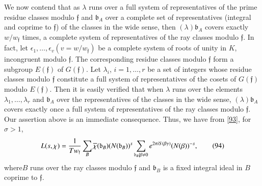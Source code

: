 We now contend that as $\lambda$ runs over a full system of
representatives of the prime residue classes modulo $\mathfrak{f}$ and
$\mathfrak{b}_{A}$ over a complete set of representatives (integral
and coprime to $\mathfrak{f}$) of the classes in the wide sense, then
$(\lambda)\mathfrak{b}_{A}$ covers exactly $w/w_{\mathfrak{f}}$ times,
a complete system of representatives of the ray classes modulo
$\mathfrak{f}$. In fact, let
$\epsilon_{1},\ldots,\epsilon_{v}(v=w/w_{\mathfrak{f}})$ be a complete
system of roots of unity in $K$, incongruent modulo
$\mathfrak{f}$. The corresponding residue classes modulo
$\mathfrak{f}$ form a subgroup $E(\mathfrak{f})$ of
$G(\mathfrak{f})$. Let $\lambda_{i}$, $i=1,\ldots,r$ be a set of
integers whose residue classes modulo $\mathfrak{f}$ constitute a full
system of representatives of the cosets of $G(\mathfrak{f})$ modulo
$E(\mathfrak{f})$. Then it is easily verified that when $\lambda$ runs
over the elements $\lambda_{1},\ldots,\lambda_{r}$ and
$\mathfrak{b}_{A}$ over the representatives of the classes in the wide
sense, $(\lambda)\mathfrak{b}_{A}$ covers exactly once a full system
of representatives of the ray classes modulo $\mathfrak{f}$. Our
assertion above is an immediate consequence. Thus, we have from
\eqref{93}, for $\sigma>1$,
\begin{equation*}
L(s,\chi)=\frac{1}{Tw_{\mathfrak{f}}}\sum_{B}\overline{\chi}(\mathfrak{b}_{B})(N(\mathfrak{b}_{B}))^{s}\sum_{\mathfrak{b}_{B}|\beta\neq
  0}e^{2\pi iS(\beta\gamma)}(N(\beta))^{-s},\tag{94}\label{94}
\end{equation*}
where\pageoriginale $B$ runs over the ray classes modulo
$\mathfrak{f}$ and $\mathfrak{b}_{B}$ is a fixed integral ideal in $B$
coprime to $\mathfrak{f}$.

